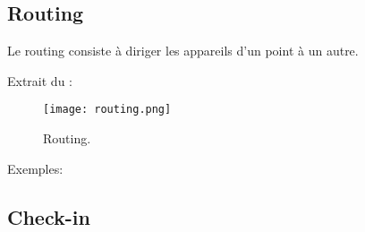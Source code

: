 \subsection{Routing}
\begin{e1}
	\item Le routing consiste à diriger les appareils d’un point à un autre.
	\item Extrait du \jp:\\
	\begin{figure}[H]
		\texttt{[image: routing.png]}
		\caption{Routing.}
		\label{fig:routing}
	\end{figure}
	\item Exemples:\\
\end{e1}

\subsection{Check-in}

